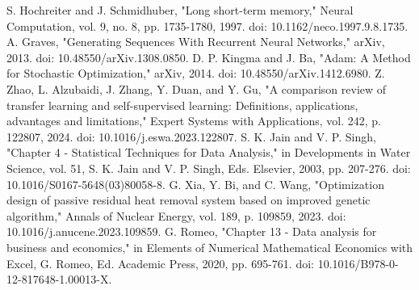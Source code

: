 \documentclass[12pt,a4paper]{article}
\begin{document}
\begin{thebibliography}{9}
 S. Hochreiter and J. Schmidhuber, "Long short-term memory," Neural Computation, vol. 9, no. 8, pp. 1735-1780, 1997. doi: 10.1162/neco.1997.9.8.1735.
 A. Graves, "Generating Sequences With Recurrent Neural Networks," arXiv, 2013. doi: 10.48550/arXiv.1308.0850.
 D. P. Kingma and J. Ba, "Adam: A Method for Stochastic Optimization," arXiv, 2014. doi: 10.48550/arXiv.1412.6980.
 Z. Zhao, L. Alzubaidi, J. Zhang, Y. Duan, and Y. Gu, "A comparison review of transfer learning and self-supervised learning: Definitions, applications, advantages and limitations," Expert Systems with Applications, vol. 242, p. 122807, 2024. doi: 10.1016/j.eswa.2023.122807.
 S. K. Jain and V. P. Singh, "Chapter 4 - Statistical Techniques for Data Analysis," in Developments in Water Science, vol. 51, S. K. Jain and V. P. Singh, Eds. Elsevier, 2003, pp. 207-276. doi: 10.1016/S0167-5648(03)80058-8.
 G. Xia, Y. Bi, and C. Wang, "Optimization design of passive residual heat removal system based on improved genetic algorithm," Annals of Nuclear Energy, vol. 189, p. 109859, 2023. doi: 10.1016/j.anucene.2023.109859.
G. Romeo, "Chapter 13 - Data analysis for business and economics," in Elements of Numerical Mathematical Economics with Excel, G. Romeo, Ed. Academic Press, 2020, pp. 695-761. doi: 10.1016/B978-0-12-817648-1.00013-X.
\end{thebibliography}
\end{document}
